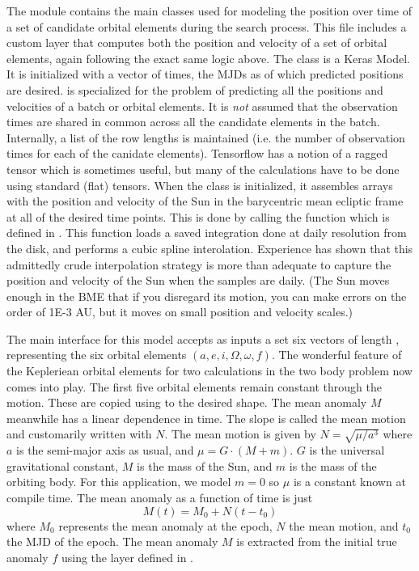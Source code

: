 The module  contains the main classes used for modeling the position over time
of a set of candidate orbital elements during the search process.
This file includes a custom layer  that computes both the position 
and velocity of a set of orbital elements, again following the exact same logic above.
The class  is a Keras Model.
It is initialized with a vector of times, the MJDs as of which predicted positions are desired.
 is specialized for the problem of predicting all the positions and velocities of a batch or orbital elements.
It is \textit{not} assumed that the observation times are shared in common across all the candidate elements in the batch.
Internally, a list of the row lengths is maintained (i.e. the number of observation times for each of the canidate elements).
Tensorflow has a notion of a ragged tensor which is sometimes useful, but many of the calculations have to be done using standard (flat) tensors.
When the class is initialized, it assembles arrays with the position and velocity of the Sun 
in the barycentric mean ecliptic frame at all of the desired time points.  
This is done by calling the function  which is defined in .
This function loads a saved integration done at daily resolution from the disk, and performs a cubic spline interolation.
Experience has shown that this admittedly crude interpolation strategy 
is more than adequate to capture the position and velocity of the Sun when the samples are daily.
(The Sun moves enough in the BME that if you disregard its motion, you can make errors on the order of 1E-3 AU, 
but it moves on small position and velocity scales.)

The main interface for this model accepts as inputs a set six vectors of length , 
representing the six orbital elements $(a, e, i, \Omega, \omega, f)$.
The wonderful feature of the Kepleriean orbital elements for two calculations in the two body problem now comes into play.
The first five orbital elements remain constant through the motion.
These are copied using  to the desired shape.
The mean anomaly $M$ meanwhile has a linear dependence in time.
The slope is called the mean motion and customarily written with $N$.  The mean motion is given by 
$N = \sqrt{\mu / a^3}$
where $a$ is the semi-major axis as usual, and $\mu = G \cdot (M + m)$.
$G$ is the universal gravitational constant, $M$ is the mass of the Sun, and $m$ is the mass of the orbiting body.
For this application, we model $m=0$ so $\mu$ is a constant known at compile time.
The mean anomaly as a function of time is just
$$M(t) = M_0 + N(t - t_0)$$
where $M_0$ represents the mean anomaly at the epoch, $N$ the mean motion, and $t_0$ the MJD of the epoch.
The mean anomaly $M$ is extracted from the initial true anomaly $f$ using the layer  defined in .

